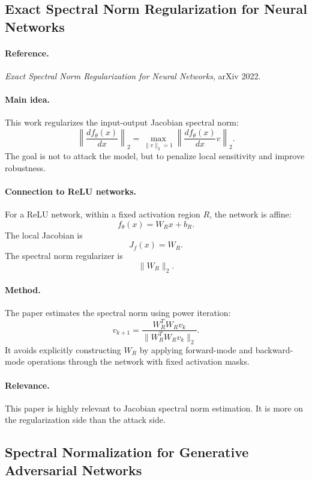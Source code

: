 \documentclass{article}
\begin{document}
\subsection{Exact Spectral Norm Regularization for Neural Networks}

\paragraph{Reference.}
\emph{Exact Spectral Norm Regularization for Neural Networks}, arXiv 2022.

\paragraph{Main idea.}
This work regularizes the input-output Jacobian spectral norm:
\[
\left\|
\frac{df_\theta(x)}{dx}
\right\|_2
=
\max_{\|v\|_2=1}
\left\|
\frac{df_\theta(x)}{dx}v
\right\|_2.
\]
The goal is not to attack the model, but to penalize local sensitivity and improve robustness.

\paragraph{Connection to ReLU networks.}
For a ReLU network, within a fixed activation region \(R\), the network is affine:
\[
f_\theta(x)=W_Rx+b_R.
\]
The local Jacobian is
\[
J_f(x)=W_R.
\]
The spectral norm regularizer is
\[
\|W_R\|_2.
\]

\paragraph{Method.}
The paper estimates the spectral norm using power iteration:
\[
v_{k+1}
=
\frac{W_R^TW_Rv_k}
{\|W_R^TW_Rv_k\|_2}.
\]
It avoids explicitly constructing \(W_R\) by applying forward-mode and backward-mode operations through the network with fixed activation masks.

\paragraph{Relevance.}
This paper is highly relevant to Jacobian spectral norm estimation. It is more on the regularization side than the attack side.

\subsection{Spectral Normalization for Generative Adversarial Networks}
\end{document}
